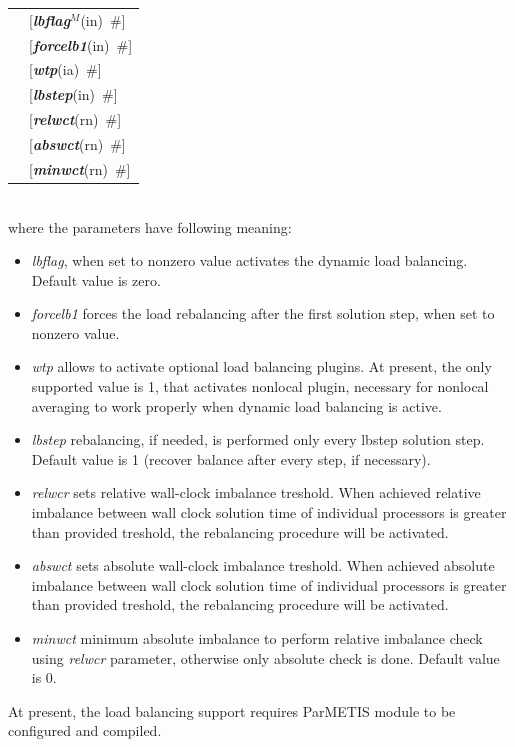 \documentclass[a4paper]{article}
\makeatletter
\newcommand{\param}[1]{{\em #1}}
\newcommand{\keywordnotype}[1]{\mbox{{\it{\bf{#1}}}}}
\newcommand{\keyword}[2]{\mbox{{\keywordnotype{#1}\tiny (#2)}}}
\newcommand{\field}[2]{\mbox{\keyword{#1}{#2}~\#}}
\newcommand{\optField}[2]{\mbox{[\field{#1}{#2}]}}
\newenvironment{record}[1][]{\begin{tabular}{|ll}}{\end{tabular}\\}
\newcommand{\recentry}[2]{{#1}&{#2}\\}
\newcounter{rcc}
\newenvironment{record}[1][\textwidth]{\setcounter{rcc}{0}\begin{tabular*}{#1}{|ll@{\extracolsep{\fill}}r}}{\end{tabular*}\\}
\newcommand{\recentry}[2]{\ifthenelse{\value{rcc}>0}{&$\backslash$ \\}{\setcounter{rcc}{1}}{#1}&{#2}}
\makeatother
\begin{document}
\noindent
\begin{record}
\recentry{\hspace{20mm}}{\optField{lbflag$^M$}{in}} \recentry{}{\optField{forcelb1}{in}}
\recentry{}{\optField{wtp}{ia}} \recentry{}{\optField{lbstep}{in}} \recentry{}{\optField{relwct}{rn}}
\recentry{}{\optField{abswct}{rn}} \recentry{}{\optField{minwct}{rn}}
\end{record}
where the parameters have following meaning:
\begin{itemize}
\item \param{lbflag}, when set to nonzero value activates the dynamic load balancing. Default value is zero.
\item \param{forcelb1} forces the load rebalancing after the first solution step, when set to nonzero value.
\item \param{wtp} allows to activate optional load balancing plugins. At present, the only supported value is 1, that activates nonlocal plugin, necessary for nonlocal averaging to work properly when dynamic load balancing is active.
\item \param{lbstep} rebalancing, if needed, is performed only every lbstep solution step. 
Default value is 1 (recover balance after every step, if necessary). 
\item \param{relwcr} sets relative wall-clock imbalance treshold. When achieved relative imbalance between wall clock solution time of individual processors is greater than provided treshold, the rebalancing procedure will be activated.
\item \param{abswct} sets absolute wall-clock imbalance treshold. When achieved absolute imbalance between wall clock solution time of individual processors is greater than provided treshold, the rebalancing procedure will be activated.
\item \param{minwct} minimum absolute imbalance to perform relative imbalance check using \param{relwcr} parameter,  otherwise only absolute check is done. Default value is 0.
\end{itemize}
At present, the load balancing support requires ParMETIS module to be configured and compiled.


%
\end{document}
